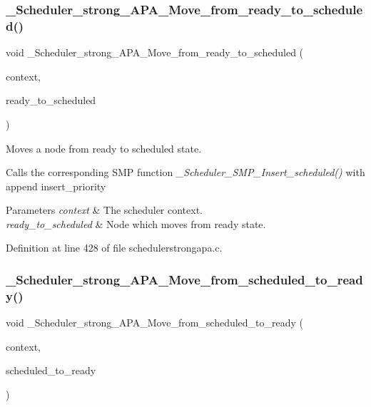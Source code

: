\subsubsection{\texorpdfstring{\+\_\+\+Scheduler\+\_\+strong\+\_\+\+A\+P\+A\+\_\+\+Move\+\_\+from\+\_\+ready\+\_\+to\+\_\+scheduled()}{\_Scheduler\_strong\_APA\_Move\_from\_ready\_to\_scheduled()}}
{\footnotesize\ttfamily void \+\_\+\+Scheduler\+\_\+strong\+\_\+\+A\+P\+A\+\_\+\+Move\+\_\+from\+\_\+ready\+\_\+to\+\_\+scheduled (\begin{DoxyParamCaption}\item[{Scheduler\+\_\+\+Context $\ast$}]{context,  }\item[{Scheduler\+\_\+\+Node $\ast$}]{ready\+\_\+to\+\_\+scheduled }\end{DoxyParamCaption})}



Moves a node from ready to scheduled state. 

Calls the corresponding S\+MP function {\itshape \+\_\+\+Scheduler\+\_\+\+S\+M\+P\+\_\+\+Insert\+\_\+scheduled()} with append insert\+\_\+priority


\begin{DoxyParams}{Parameters}
{\em context} & The scheduler context. \\
\hline
{\em ready\+\_\+to\+\_\+scheduled} & Node which moves from ready state. \\
\hline
\end{DoxyParams}


Definition at line 428 of file schedulerstrongapa.\+c.

\mbox{\label{group__RTEMSScoreSchedulerStrongAPA_ga9589d6542faf83879288d437ca84c907}} 
\subsubsection{\texorpdfstring{\+\_\+\+Scheduler\+\_\+strong\+\_\+\+A\+P\+A\+\_\+\+Move\+\_\+from\+\_\+scheduled\+\_\+to\+\_\+ready()}{\_Scheduler\_strong\_APA\_Move\_from\_scheduled\_to\_ready()}}
{\footnotesize\ttfamily void \+\_\+\+Scheduler\+\_\+strong\+\_\+\+A\+P\+A\+\_\+\+Move\+\_\+from\+\_\+scheduled\+\_\+to\+\_\+ready (\begin{DoxyParamCaption}\item[{Scheduler\+\_\+\+Context $\ast$}]{context,  }\item[{Scheduler\+\_\+\+Node $\ast$}]{scheduled\+\_\+to\+\_\+ready }\end{DoxyParamCaption})}



